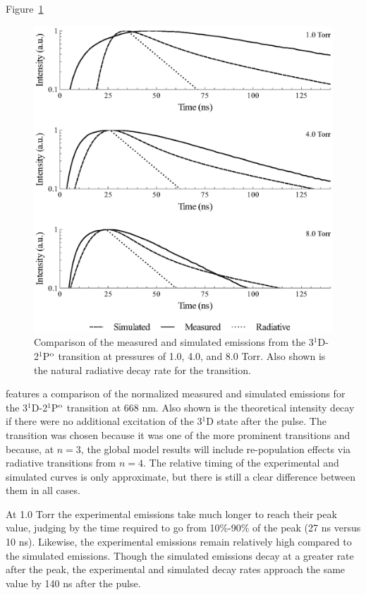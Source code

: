 Figure~\ref{fig:667comp}
\begin{figure}
  \centering
  \includegraphics{./chapters/emissions/figures/667comp.eps}
  \caption{Comparison of the measured and simulated emissions from the
  3$^1$D-2$^1$P$^\mathrm{o}$ transition at pressures of 1.0, 4.0, and 8.0 Torr. Also
  shown is the natural radiative decay rate for the transition.}
  \label{fig:667comp}
\end{figure}
features a comparison of the normalized measured and simulated emissions for the
3$^1$D-2$^1$P$^\mathrm{o}$ transition at 668 nm. Also shown is the theoretical
intensity decay if there were no additional excitation of the 3$^1$D state after
the pulse. The transition was chosen because it was one of the more prominent
transitions and because, at $n=3$, the global model results will include
re-population effects via radiative transitions from $n=4$. The relative timing
of the experimental and simulated curves is only approximate, but there is still
a clear difference between them in all cases.

At 1.0 Torr the experimental emissions take much longer to reach their peak
value, judging by the time required to go from 10\%-90\% of the peak (27 ns
versus 10 ns). Likewise, the experimental emissions remain relatively high
compared to the simulated emissions. Though the simulated emissions decay at a
greater rate after the peak, the experimental and simulated decay rates approach
the same value by 140 ns after the pulse.

